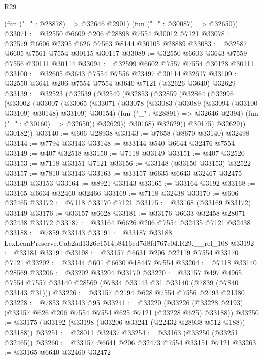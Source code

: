 \begin{lexlean}{R29}
\begin{coremodule}
      (fun ("_" : @28878) => @32646 @2901)
      (fun ("_" : @30087) => @32650))
@33071 := @32550 @6609 @206 @28898 @7554 @30012 @7121
@33078 := @32579 @6606 @2395 @626 @7563 @8144 @30105 @28889
@33083 := @32587 @6605 @7561 @7554 @30115 @30117
@33089 := @32550 @6603 @3643 @7559 @7556 @30111 @30114
@33094 := @32599 @6602 @7557 @7554 @30128 @30111
@33100 := @32605 @3643 @7554 @7556 @23497 @30114 @32617
@33109 := @32550 @3641 @206 @7554 @7554 @3640 @7121 (@32626 @3640) @32629
@33139 := @32523
    (@32539
      (@32549
        (@32853
          (@32859
            (@32864
              (@32996
                (@33002
                  (@33007
                    (@33065
                      (@33071
                        (@33078
                          (@33083 (@33089 (@33094 (@33100 @33109) @30148) @33109) @30154)
                          (fun ("_" : @28891) => @32646 @2394)
                          (fun ("_" : @30160) => @32650))
                        @32629))
                    @30168)
                  @32629))
              @30175)
            @32629))
        @30182))
@33140 := @606 @28938
@33143 := @7658 (@8670 @33140) @32498
@33144 := @7794 @33143
@33148 := @33144 @540 @6644 @32476 @7554
@33149 := @407 @32518
@33150 := @7118 @33149
@33151 := @407 @32520
@33153 := @7118 @33151 @7121
@33156 := @33148 (@33150 @33153) @32522
@33157 := @7810 @33143
@33163 := @33157 @6635 @6643 @32467 @32475 @33149 @33153
@33164 := @8921 @33143
@33165 := @33164 @3192
@33168 := @33165 @6634 @32460 @32466
@33169 := @7118 @32438
@33170 := @606 @32465
@33172 := @7118 @33170 @7121
@33175 := @33168 (@33169 @33172) @33149
@33176 := @33157 @6628
@33181 := @33176 @6633 @32458 @28071 @32438 @33172
@33187 := @33164 @6626 @206 @7554 @32435 @7121 @32438
@33188 := @7859 @33143
@33191 := @33187 @33188 LexLeanPreserve.Cab2ad1326c1514b8416cd7d8fd767c04.R29.__rel_108
@33192 := @33181 @33191
@33198 := @33157 @6631 @206 @22119 @7554 @33170 @7121
@33202 := @33144 @601 @6630 @18447 @7554
@33204 := @7118 @33140 @28569
@33206 := @33202 @33204 @33170
@33220 := @33157
    @497
    @4965
    @7554
    @7557
    @33140
    @28569
    (@7834 @33143 @31 @33140 (@7839 (@7840 @33143 @31)))
@33226 := @33157 @2194 @628 @7554 @7556 @2193 @21380
@33228 := @7853 @33143 @95
@33241 := @33220
    (@33226 (@33228 @2193) (@33157 @626 @206 @7554 @7554 @625 @7121 (@33228 @625) @33188))
@33250 := @33175 (@33192 (@33198 (@33206 @33241 (@22432 @28938 @512 @188)) @33188))
@33251 := @28011 @32437
@33254 := @33163 (@33250 (@33251 @32465))
@33260 := @33157 @6641 @206 @32473 @7554 @33151 @7121
@33263 := @33165 @6640 @32460 @32472

\end{coremodule}
\end{lexlean}
